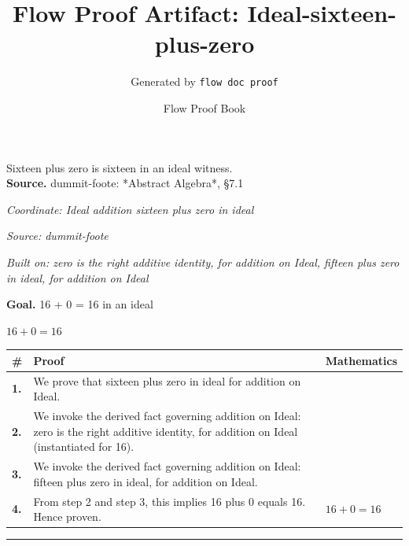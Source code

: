 \documentclass[11pt]{article}
\title{Flow Proof Artifact: Ideal-sixteen-plus-zero}
\author{Generated by \texttt{flow doc proof}}
\date{Flow Proof Book}
\theoremstyle{definition}
\begin{document}
\maketitle
Sixteen plus zero is sixteen in an ideal witness.\\[0.5em]
\textbf{Source.} dummit-foote: *Abstract Algebra*, §7.1\\[0.5em]
\bigskip
{}\par
\smallskip\noindent\textit{Coordinate: Ideal \cdot addition \cdot sixteen plus zero in ideal}\par
\smallskip\noindent\textit{Source: dummit-foote}\par
\smallskip\noindent\textit{Built on: zero is the right additive identity, for addition on Ideal, fifteen plus zero in ideal, for addition on Ideal}\par
\medskip
\noindent\textbf{Goal.} 16 + 0 = 16 in an ideal\par
\noindent$\displaystyle 16 + 0 = 16$\par
\medskip
\noindent
\begin{tabular}{@{} >{\raggedright\arraybackslash}p{} >{\raggedright\arraybackslash}p{} >{\raggedleft\arraybackslash}p{} @{}}
\textbf{\#} & \textbf{Proof} & \textbf{Mathematics} \\
\midrule
\textbf{1.} & We prove that sixteen plus zero in ideal for addition on Ideal. & \\[0.45em]
\textbf{2.} & We invoke the derived fact governing addition on Ideal: zero is the right additive identity, for addition on Ideal (instantiated for 16). & \\[0.45em]
\textbf{3.} & We invoke the derived fact governing addition on Ideal: fifteen plus zero in ideal, for addition on Ideal. & \\[0.45em]
\textbf{4.} & From step 2 and step 3, this implies 16 plus 0 equals 16. Hence proven. & $\displaystyle 16 + 0 = 16$ \\[0.45em]
\bottomrule
\end{tabular}
\label{thm:Ideal-addition-sixteen_plus_zero_in_ideal}
\par\medskip\hrule
\end{document}
